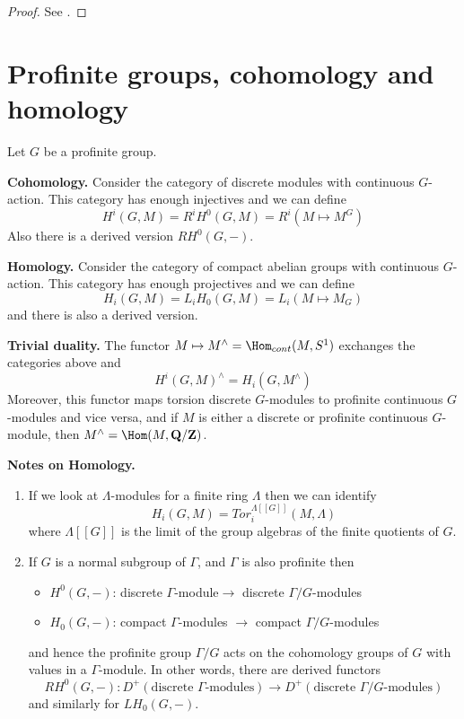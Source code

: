 \begin{proof}
See \cite{WeilII}.
\end{proof}




\section{Profinite groups, cohomology and homology}
\label{section-profinite-cohomology}

\noindent
Let $G$ be a profinite group.

\medskip\noindent
{\bf Cohomology.}
Consider the category of discrete modules with continuous $G$-action.
This category has enough injectives and we can define
$$
H^i(G, M) = R^iH^0(G, M) = R^i(M\mapsto M^G)
$$
Also there is a derived version $RH^0(G, -)$.

\medskip\noindent
{\bf Homology.}
Consider the category of compact abelian groups with continuous $G$-action.
This category has enough projectives and we can define
$$
H_i(G, M) = L_iH_0(G, M)=L_i(M\mapsto M_G)
$$
and there is also a derived version.

\medskip\noindent
{\bf Trivial duality.}
The functor $M\mapsto M^\wedge = \Hom_{cont}(M, S^1)$
exchanges the categories above and
$$
H^i(G, M)^\wedge = H_i(G, M^\wedge)
$$
Moreover, this functor maps torsion discrete $G$-modules to profinite
continuous $G$-modules and vice versa, and if $M$ is either a discrete or
profinite continuous $G$-module, then
$M^\wedge = \Hom(M, \mathbf{Q}/\mathbf{Z})$.

\medskip\noindent
{\bf Notes on Homology.}
\begin{enumerate}
\item If we look at $\Lambda$-modules for a finite ring $\Lambda$
then we can identify
$$
H_i(G, M)=Tor_i^{\Lambda[[G]]}(M, \Lambda)
$$
where $\Lambda[[G]]$ is the limit of the group algebras of the finite
quotients of $G$.
\item If $G$ is a normal subgroup of $\Gamma$, and $\Gamma$ is also
profinite then
\begin{itemize}
\item $H^0(G, -)$: discrete $\Gamma$-module$\to$ discrete
$\Gamma/G$-modules
\item $H_0(G, -)$: compact $\Gamma$-modules $\to$ compact
$\Gamma/G$-modules
\end{itemize}
and hence the profinite group $\Gamma/G$ acts on the cohomology groups
of $G$ with values in a $\Gamma$-module. In other words, there are derived
functors
$$
RH^0(G, -) :
D^{+}(\text{discrete }\Gamma\text{-modules})
\longrightarrow
D^{+}(\text{discrete }\Gamma/G\text{-modules})
$$
and similarly for $LH_0(G, -)$.
\end{enumerate}








